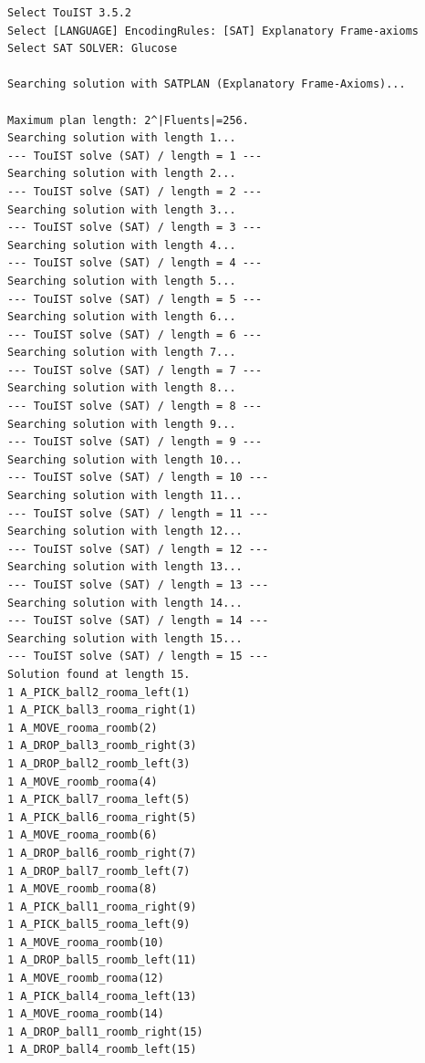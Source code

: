 \begin{scriptsize}
\begin{verbatim}
Select TouIST 3.5.2
Select [LANGUAGE] EncodingRules: [SAT] Explanatory Frame-axioms
Select SAT SOLVER: Glucose

Searching solution with SATPLAN (Explanatory Frame-Axioms)...

Maximum plan length: 2^|Fluents|=256.
Searching solution with length 1...
--- TouIST solve (SAT) / length = 1 ---
Searching solution with length 2...
--- TouIST solve (SAT) / length = 2 ---
Searching solution with length 3...
--- TouIST solve (SAT) / length = 3 ---
Searching solution with length 4...
--- TouIST solve (SAT) / length = 4 ---
Searching solution with length 5...
--- TouIST solve (SAT) / length = 5 ---
Searching solution with length 6...
--- TouIST solve (SAT) / length = 6 ---
Searching solution with length 7...
--- TouIST solve (SAT) / length = 7 ---
Searching solution with length 8...
--- TouIST solve (SAT) / length = 8 ---
Searching solution with length 9...
--- TouIST solve (SAT) / length = 9 ---
Searching solution with length 10...
--- TouIST solve (SAT) / length = 10 ---
Searching solution with length 11...
--- TouIST solve (SAT) / length = 11 ---
Searching solution with length 12...
--- TouIST solve (SAT) / length = 12 ---
Searching solution with length 13...
--- TouIST solve (SAT) / length = 13 ---
Searching solution with length 14...
--- TouIST solve (SAT) / length = 14 ---
Searching solution with length 15...
--- TouIST solve (SAT) / length = 15 ---
Solution found at length 15.
1 A_PICK_ball2_rooma_left(1)
1 A_PICK_ball3_rooma_right(1)
1 A_MOVE_rooma_roomb(2)
1 A_DROP_ball3_roomb_right(3)
1 A_DROP_ball2_roomb_left(3)
1 A_MOVE_roomb_rooma(4)
1 A_PICK_ball7_rooma_left(5)
1 A_PICK_ball6_rooma_right(5)
1 A_MOVE_rooma_roomb(6)
1 A_DROP_ball6_roomb_right(7)
1 A_DROP_ball7_roomb_left(7)
1 A_MOVE_roomb_rooma(8)
1 A_PICK_ball1_rooma_right(9)
1 A_PICK_ball5_rooma_left(9)
1 A_MOVE_rooma_roomb(10)
1 A_DROP_ball5_roomb_left(11)
1 A_MOVE_roomb_rooma(12)
1 A_PICK_ball4_rooma_left(13)
1 A_MOVE_rooma_roomb(14)
1 A_DROP_ball1_roomb_right(15)
1 A_DROP_ball4_roomb_left(15)
\end{verbatim}
\end{scriptsize}

